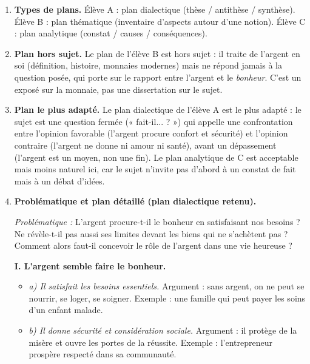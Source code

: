 \documentclass[11pt]{article}
\newcommand{\cle}[1]{{\popxbold\color{popdark}#1}}
\begin{document}
\begin{corrige}

\begin{enumerate}
\item \textbf{Types de plans.} Élève A : plan \cle{dialectique} (thèse / antithèse / synthèse). Élève B : plan \cle{thématique} (inventaire d'aspects autour d'une notion). Élève C : plan \cle{analytique} (constat / causes / conséquences).

\item \textbf{Plan hors sujet.} Le plan de l'élève B est hors sujet : il traite de l'argent en soi (définition, histoire, monnaies modernes) mais ne répond jamais à la question posée, qui porte sur le rapport entre l'argent et le \emph{bonheur}. C'est un exposé sur la monnaie, pas une dissertation sur le sujet.

\item \textbf{Plan le plus adapté.} Le plan dialectique de l'élève A est le plus adapté : le sujet est une question fermée (« fait-il... ? ») qui appelle une confrontation entre l'opinion favorable (l'argent procure confort et sécurité) et l'opinion contraire (l'argent ne donne ni amour ni santé), avant un dépassement (l'argent est un moyen, non une fin). Le plan analytique de C est acceptable mais moins naturel ici, car le sujet n'invite pas d'abord à un constat de fait mais à un débat d'idées.

\item \textbf{Problématique et plan détaillé (plan dialectique retenu).}

\emph{Problématique :} L'argent procure-t-il le bonheur en satisfaisant nos besoins ? Ne révèle-t-il pas aussi ses limites devant les biens qui ne s'achètent pas ? Comment alors faut-il concevoir le rôle de l'argent dans une vie heureuse ?

\textbf{I. L'argent semble faire le bonheur.}
\begin{itemize}
\item \emph{a) Il satisfait les besoins essentiels.} Argument : sans argent, on ne peut se nourrir, se loger, se soigner. Exemple : une famille qui peut payer les soins d'un enfant malade.
\item \emph{b) Il donne sécurité et considération sociale.} Argument : il protège de la misère et ouvre les portes de la réussite. Exemple : l'entrepreneur prospère respecté dans sa communauté.
\end{itemize}


\end{enumerate}
\end{corrige}
\end{document}
